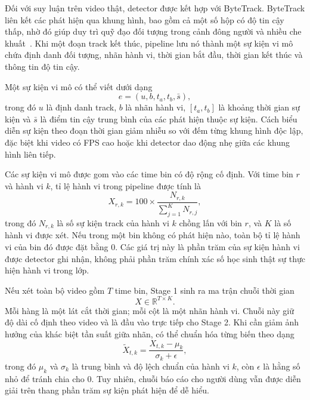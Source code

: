 Đối với suy luận trên video thật, detector được kết hợp với ByteTrack. ByteTrack liên kết các phát hiện qua khung hình, bao gồm cả một số hộp có độ tin cậy thấp, nhờ đó giúp duy trì quỹ đạo đối tượng trong cảnh đông người và nhiều che khuất \,\cite{zhang2022bytetrack}. Khi một đoạn track kết thúc, pipeline lưu nó thành một sự kiện vi mô chứa định danh đối tượng, nhãn hành vi, thời gian bắt đầu, thời gian kết thúc và thông tin độ tin cậy.

Một sự kiện vi mô có thể viết dưới dạng
\begin{equation}
\label{eq:tracked-event}
    e=(u,b,t_a,t_b,\bar{s}),
\end{equation}
trong đó \(u\) là định danh track, \(b\) là nhãn hành vi, \([t_a,t_b]\) là khoảng thời gian sự kiện và \(\bar{s}\) là điểm tin cậy trung bình của các phát hiện thuộc sự kiện. Cách biểu diễn sự kiện theo đoạn thời gian giảm nhiễu so với đếm từng khung hình độc lập, đặc biệt khi video có FPS cao hoặc khi detector dao động nhẹ giữa các khung hình liên tiếp.

Các sự kiện vi mô được gom vào các time bin có độ rộng cố định. Với time bin \(r\) và hành vi \(k\), tỉ lệ hành vi trong pipeline được tính là
\begin{equation}
\label{eq:time-bin-percentage}
    X_{r,k}=100\times\frac{N_{r,k}}{\sum_{j=1}^{K}N_{r,j}},
\end{equation}
trong đó \(N_{r,k}\) là số sự kiện track của hành vi \(k\) chồng lấn với bin \(r\), và \(K\) là số hành vi được xét. Nếu trong một bin không có phát hiện nào, toàn bộ tỉ lệ hành vi của bin đó được đặt bằng 0. Các giá trị này là phần trăm của sự kiện hành vi được detector ghi nhận, không phải phần trăm chính xác số học sinh thật sự thực hiện hành vi trong lớp.

Nếu xét toàn bộ video gồm \(T\) time bin, Stage 1 sinh ra ma trận chuỗi thời gian
\begin{equation}
\label{eq:time-series-matrix}
    X\in\mathbb{R}^{T\times K}.
\end{equation}
Mỗi hàng là một lát cắt thời gian; mỗi cột là một nhãn hành vi. Chuỗi này giữ độ dài cố định theo video và là đầu vào trực tiếp cho Stage 2. Khi cần giảm ảnh hưởng của khác biệt tần suất giữa nhãn, có thể chuẩn hóa từng biến theo dạng
\begin{equation}
\label{eq:standardized-time-series}
    \widetilde{X}_{t,k}=\frac{X_{t,k}-\mu_k}{\sigma_k+\epsilon},
\end{equation}
trong đó \(\mu_k\) và \(\sigma_k\) là trung bình và độ lệch chuẩn của hành vi \(k\), còn \(\epsilon\) là hằng số nhỏ để tránh chia cho 0. Tuy nhiên, chuỗi báo cáo cho người dùng vẫn được diễn giải trên thang phần trăm sự kiện phát hiện để dễ hiểu.

